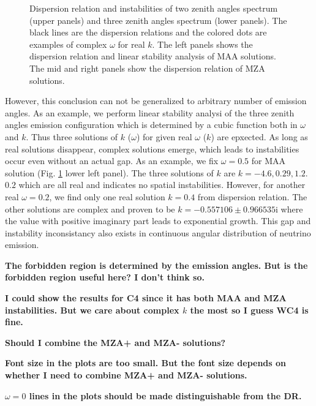 \documentclass[%
preprint,
 amsmath,amssymb,
 aps,
 prd
]{revtex4-1}
\begin{document}
\begin{figure}[!htb]
\endminipage\hfill
\caption{Dispersion relation and instabilities of two zenith angles spectrum (upper panels) and three zenith angles spectrum (lower panels). The black lines are the dispersion relations and the colored dots are examples of complex $\omega$ for real $k$. The left panels shows the dispersion relation and linear stability analysis of MAA solutions. The mid and right panels show the dispersion relation of MZA solutions.}
\label{fig-dr-db}
\end{figure}


However, this conclusion can not be generalized to arbitrary number of emission angles. As an example, we perform linear stability analysi of the three zenith angles emission configuration which is determined by a cubic function both in $\omega$ and $k$. Thus three solutions of $k$ ($\omega$) for given real $\omega$ ($k$) are epxected. As long as real solutions disappear, complex solutions emerge, which leads to instabilities occur even without an actual gap. As an example, we fix $\omega= 0.5$ for MAA solution (Fig. \ref{fig-dr-db} lower left panel). The three solutions of $k$ are $k=-4.6, 0.29, 1.2$.  $0.2$ which are all real and indicates no spatial instabilities. However, for another real $\omega = 0.2$, we find only one real solution $k=0.4$ from dispersion relation. The other solutions are complex and proven to be $k = -0.557106\pm 0.966535\mathrm i$ where the value with positive imaginary part leads to exponential growth. This gap and instability inconsistancy also exists in continuous angular distribution of neutrino emission.









{\color{red}\bf The forbidden region is determined by the emission angles. But is the forbidden region useful here? I don't think so.}

{\color{red}\bf I could show the results for C4 since it has both MAA and MZA instabilities. But we care about complex $k$ the most so I guess WC4 is fine.}

{\color{red}\bf Should I combine the MZA+ and MZA- solutions? }

{\color{red}\bf Font size in the plots are too small. But the font size depends on whether I need to combine MZA+ and MZA- solutions. }

{\color{red}\bf $\omega=0$ lines in the plots should be made distinguishable from the DR. }
\end{document}
